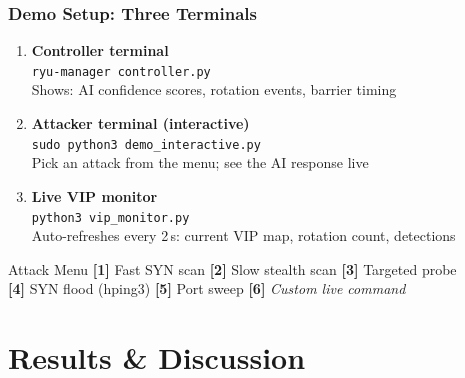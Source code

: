 \documentclass{beamer}
\begin{document}
\begin{frame}
\frametitle{Demo Setup: Three Terminals}

\begin{enumerate}
  \item[\textbf{T1}] \textbf{Controller terminal}\\
        \texttt{ryu-manager controller.py}\\
        \small Shows: AI confidence scores, rotation events, barrier timing

  \vspace{6pt}
  \item[\textbf{T2}] \textbf{Attacker terminal (interactive)}\\
        \texttt{sudo python3 demo\_interactive.py}\\
        \small Pick an attack from the menu; see the AI response live

  \vspace{6pt}
  \item[\textbf{T3}] \textbf{Live VIP monitor}\\
        \texttt{python3 vip\_monitor.py}\\
        \small Auto-refreshes every 2\,s: current VIP map, rotation count, detections
\end{enumerate}

\vspace{8pt}
\begin{block}{Attack Menu}
\textbf{[1]} Fast SYN scan \quad
\textbf{[2]} Slow stealth scan \quad
\textbf{[3]} Targeted probe\\
\textbf{[4]} SYN flood (hping3) \quad
\textbf{[5]} Port sweep \quad
\textbf{[6]} \textit{Custom live command}
\end{block}

\end{frame}

\section{Results \& Discussion}
\end{document}
